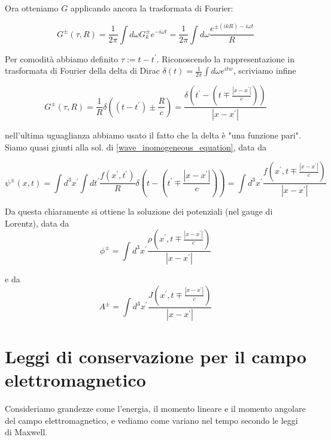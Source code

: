 \documentclass{report}
\begin{document}
Ora otteniamo $G$ applicando ancora la trasformata di Fourier: 

\begin{equation}
    G^{\pm}(\tau, R) = \frac{1}{2\pi}\int d\omega G_k^{\pm}e^{-i\omega t} = \frac{1}{2\pi}\int d\omega \frac{e^{\pm (ikR)-i\omega t}}{R}
\end{equation}

Per comodità abbiamo definito $\tau := t-t^{'}$. 
Riconoscendo la rappresentazione in trasformata di Fourier della delta di Dirac $\delta(t) = \frac{1}{2\pi}\int d\omega e^{itw}$, scriviamo infine 

\begin{equation}
    G^\pm (\tau, R) = \frac{1}{R}\delta((t-t^{'}) \pm \frac{R}{c}) = \frac{\delta(t^{'}-(t \mp \frac{|x-x^{'}|}{c}))}{|x-x^{'}|}
\end{equation}

nell'ultima uguaglianza abbiamo usato il fatto che la delta è "una funzione pari". Siamo quasi giunti alla sol. di \ref{wave_inomogeneous_equation}, data da 

\begin{tcolorbox}[colback=doc!15, colframe=black, boxrule=1pt]
\begin{equation}
    \psi^\pm(x, t) = \int d^3x^{'} \int dt^{'} \frac{f(x^{'}, t^{'})}{R}\delta(t-(t^{'} \mp \frac{|x-x^{'}|}{c})) = \int d^3x^{'} \frac{f(x^{'}, t \mp \frac{|x-x^{'}|}{c})}{|x-x^{'}|}
\end{equation}
\end{tcolorbox}

Da questa chiaramente si ottiene la soluzione dei potenziali (nel gauge di Lorentz), data da 
\begin{equation}
    \phi^{\pm} = \int d^3x^{'} \frac{\rho(x^{'}, t \mp \frac{|x-x^{'}|}{c})}{|x-x^{'}|}
\end{equation}

e da 
\begin{equation}
    A^{\pm} = \int d^3x^{'} \frac{J(x^{'}, t \mp \frac{|x-x^{'}|}{c})}{|x-x^{'}|}
\end{equation}

\section{Leggi di conservazione per il campo elettromagnetico}

Consideriamo grandezze come l'energia, il momento lineare e il momento angolare del campo elettromagnetico, e vediamo come variano nel tempo secondo le leggi di Maxwell. \\
\end{document}
